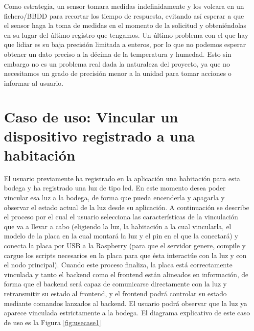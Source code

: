 Como estrategia, un sensor tomara medidas indefinidamente y los volcara en un fichero/BBDD para recortar los tiempo de respuesta, evitando así esperar a que el sensor haga la toma de medidas en el momento de la solicitud y obteniéndolas en su lugar del último registro que tengamos. Un último problema con el que hay que lidiar es su baja precisión limitada a enteros, por lo que no podemos esperar obtener un dato preciso a la décima de la temperatura y humedad. Esto sin embargo no es un problema real dada la naturaleza del proyecto, ya que no necesitamos un grado de precisión menor a la unidad para tomar acciones o informar al usuario.

\section{Caso de uso: Vincular un dispositivo registrado a una habitación}
\label{ch:Capitulo5.2}
El usuario previamente ha registrado en la aplicación una habitación para esta bodega y ha registrado una luz de tipo led. En este momento desea poder vincular esa luz a la bodega, de forma que pueda encenderla y apagarla y observar el estado actual de la luz desde su aplicación. A continuación se describe el proceso por el cual el usuario selecciona las características de la vinculación que va a llevar a cabo (eligiendo la luz, la habitación a la cual vincularla, el modelo de la placa en la cual montará la luz y el pin en el que la conectará) y conecta la placa por USB a la Raspberry (para que el servidor genere, compile y cargue los scripts necesarios en la placa para que ésta interactúe con la luz y con el nodo principal). Cuando este proceso finaliza, la placa está correctamente vinculada y tanto el backend como el frontend están alineados en información, de forma que el backend será capaz de comunicarse directamente con la luz y retransmitir su estado al frontend, y el frontend podrá controlar su estado mediante comandos lanzados al backend. El usuario podrá observar que la luz ya aparece vinculada estrictamente a la bodega.
El diagrama explicativo de este caso de uso es la Figura \ref{fig:usecase1}

